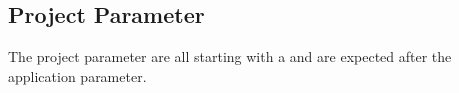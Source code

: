 \subsection{Project Parameter}

The project parameter are all starting with a  and are expected
after the application parameter.



